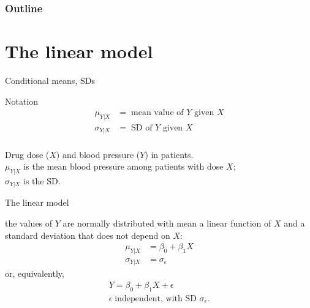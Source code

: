 %
%
%



\subtitle{confidence intervals, outliers, and leverage}

\date{28 April 2015}





\begin{frame}
  \maketitle
\end{frame}


\begin{frame}\frametitle<presentation>{Outline}
  \tableofcontents
\end{frame}


\section{The linear model}

\begin{frame}{Conditional means, SDs}

  \begin{block}{Notation}
    \begin{align*}
      \mu_{Y|X} &= \; \text{mean value of $Y$ given $X$} \\
      \sigma_{Y|X} &= \; \text{SD of $Y$ given $X$} \\
    \end{align*}
  \end{block}


    \vspace{2em}

    Drug dose ($X$) and blood pressure ($Y$) in patients. \\
    $\mu_{Y|X}$ is the mean blood pressure among patients with dose $X$; \\
    $\sigma_{Y|X}$ is the SD.

\end{frame}

\begin{frame}{The linear model}

   the values of $Y$ are normally distributed with mean
  a linear function of $X$ and a standard deviation that does not depend on $X$:
  \begin{align*}
    \mu_{Y|X} &= \beta_0 + \beta_1 X \\
    \sigma_{Y|X} &= \sigma_\epsilon
  \end{align*}
  or, equivalently,
  \begin{align*}
    Y = \beta_0 + \beta_1 X + \epsilon \\
    \epsilon \; \text{independent, with SD $\sigma_\epsilon$} .
  \end{align*}

\end{frame}


